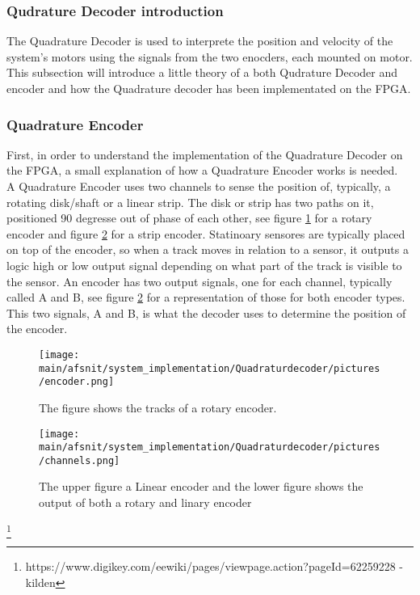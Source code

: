 \documentclass[../../../main]{subfiles}
\begin{document}
\subsubsection{Qudrature Decoder introduction}
The Quadrature Decoder is used to interprete the position and velocity of the system's motors using the signals from the two enocders, each  mounted on motor. This subsection will introduce a little theory of a both Qudrature Decoder and encoder and how the Quadrature decoder has been implementated on the FPGA.
\subsubsection{Quadrature Encoder}
\label{sub:Theory}

First, in order to understand the implementation of the Quadrature Decoder on the FPGA, a small explanation of how a Quadrature Encoder works is needed. \\
A Quadrature Encoder uses two channels to sense the position of, typically, a rotating disk/shaft or a linear strip. The disk or strip has two paths on it, positioned 90 degresse out of phase of each other, see figure \ref{rotary_encoder} for a rotary encoder and figure \ref{channels_1} for a strip encoder. Statinoary sensores are typically placed on top of the encoder, so when a track moves in relation to a sensor, it outputs a logic high or low output signal depending on what part of the track is visible to the sensor. An encoder has two output signals, one for each channel, typically called A and B, see figure \ref{channels_1} for a representation of those for both encoder types. This two signals, A and B, is what the decoder uses to determine the position of the encoder.

\begin{figure}[H]
  \texttt{[image: \\main/afsnit/system\_implementation/Quadraturdecoder/pictures/encoder.png]}
  \caption{The figure shows the tracks of a rotary encoder.}
  \label{rotary_encoder}
\end{figure}

\begin{figure}[H]
  \texttt{[image: \\main/afsnit/system\_implementation/Quadraturdecoder/pictures/channels.png]}
  \caption{The upper figure a Linear encoder and the lower figure shows the output of both a rotary and linary encoder}
  \label{channels_1}
\end{figure}
\footnote{https://www.digikey.com/eewiki/pages/viewpage.action?pageId=62259228 - kilden}
\end{document}
